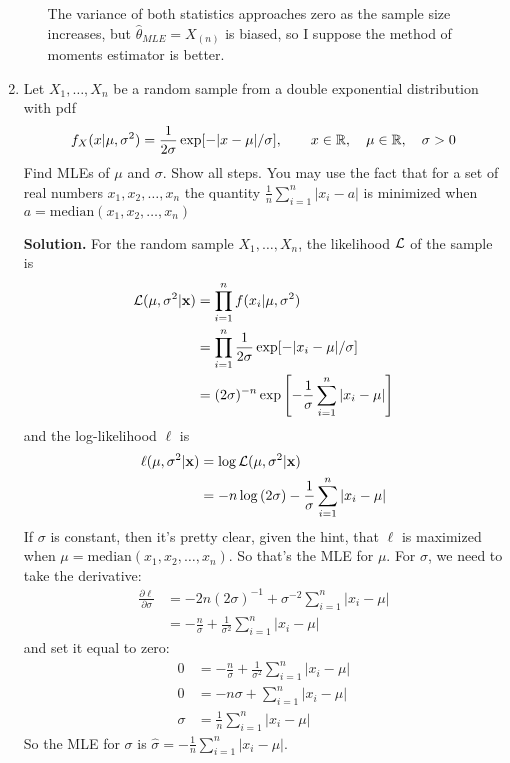 \documentclass[titlepage]{article}
\begin{document}
\begin{enumerate}
\begin{enumerate}
  The variance of both statistics approaches zero as the sample size increases, but $\hat{\theta}_{MLE} = X_{(n)}$ is biased, so I suppose the method of moments estimator is better.
  \end{enumerate}

\item Let $X_1, \ldots, X_n$ be a random sample from a double exponential distribution with pdf
  \[f_X(x | \mu, \sigma^2) = \frac{1}{2\sigma}\exp[-|x-\mu|/\sigma], \qquad x \in \mathbb{R}, \quad \mu \in \mathbb{R}, \quad \sigma > 0\]
Find MLEs of $\mu$ and $\sigma$. Show all steps. You may use the fact that for a set of real numbers $x_1, x_2, \ldots, x_n$ the quantity $\frac{1}{n}\sum_{i=1}^n |x_i - a|$ is minimized when $a = \text{median}(x_1, x_2, \ldots, x_n)$

\textbf{Solution.} For the random sample $X_1, \ldots, X_n$, the likelihood $\mathcal{L}$ of the sample is
  \[ \begin{aligned}
  \mathcal{L}(\mu, \sigma^2 | \mathbf{x}) &= \prod_{i=1}^n f(x_i|\mu, \sigma^2) \\
  &= \prod_{i=1}^n\frac{1}{2\sigma} \exp[-|x_i - \mu|/\sigma] \\
  &= (2\sigma)^{-n} \exp\left[-\frac{1}{\sigma}\sum_{i=1}^n|x_i - \mu|\right]
  \end{aligned} \]
and the log-likelihood $\ell$ is
  \[ \begin{aligned}
  \ell(\mu, \sigma^2 | \mathbf{x}) &= \log \mathcal{L}(\mu, \sigma^2 | \mathbf{x}) \\
                                &= -n \log\left(2\sigma\right) - \frac{1}{\sigma}\sum_{i=1}^n |x_i - \mu|
  \end{aligned} \]
If $\sigma$ is constant, then it's pretty clear, given the hint, that $\ell$ is maximized when $\mu = \text{median}(x_1, x_2, \ldots, x_n)$. So that's the MLE for $\mu$. For $\sigma$, we need to take the derivative:
  \[\begin{aligned}
  \frac{\partial \ell}{\partial \sigma} &= -2n(2\sigma)^{-1} + \sigma^{-2} \sum_{i=1}^n |x_i - \mu| \\
  &= -\frac{n}{\sigma} + \frac{1}{\sigma^2}\sum_{i=1}^n |x_i - \mu|
  \end{aligned}\]
and set it equal to zero:
  \[\begin{aligned}
  0 &= -\frac{n}{\sigma} + \frac{1}{\sigma^2}\sum_{i=1}^n |x_i - \mu| \\
  0 &= -n \sigma + \sum_{i=1}^n |x_i - \mu| \\
  \sigma &= \frac{1}{n}\sum_{i=1}^n |x_i - \mu|
  \end{aligned}\]
So the MLE for $\sigma$ is $\hat{\sigma} = -\frac{1}{n}\sum_{i=1}^n |x_i - \mu| $.


\end{enumerate}
\end{document}
